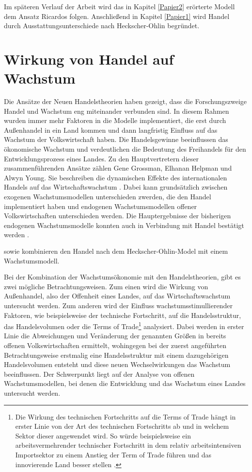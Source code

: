 Im sp{\"a}teren Verlauf der Arbeit wird das in Kapitel \ref{Papier2} er{\"o}rterte Modell dem Ansatz Ricardos folgen. Anschlie{\ss}end in Kapitel \ref{Papier1} wird Handel durch Ausstattungsunterschiede nach Heckscher-Ohlin begründet.


\section{Wirkung von Handel auf Wachstum}
Die Ansätze der Neuen Handelstheorien haben gezeigt, dass die Forschungszweige Handel und Wachstum eng miteinander verbunden sind. In diesem Rahmen wurden immer mehr Faktoren in die Modelle implementiert, die erst durch Au{\ss}enhandel in ein Land kommen und dann langfristig Einfluss auf das Wachstum der Volkswirtschaft haben. Die Handelsgewinne beeinflussen das ökonomische Wachstum und verdeutlichen die Bedeutung des Freihandels für den Entwicklungsprozess eines Landes. Zu den Hauptvertretern dieser zusammenführenden Ansätze zählen Gene Grossman, Elhanan Helpman und Alwyn Young.\newline  
Sie beschreiben die dynamischen Effekte des internationalen Handels auf das Wirtschaftswachstum \citep{Young.1991,Grossman.1995}. Dabei kann grundsätzlich zwischen exogenen Wachstumsmodellen unterschieden zwerden, die den Handel implementiert haben \citep{Dixit.1980,Ethier.1982, Krugman.1979ab,Krugman.1981,Lancaster.1980} und endogenen Wachstumsmodellen offener Volkswirtschaften \citep{Dinopoulos.,Feenstra.,Grossman.1989a,Grossman1989b.,Grossman.1990d,Grossman.1991c, Krugman.1990,Segerstrom.1990,Young.1991,Backus.} unterschieden werden. Die Hauptergebnisse der bisherigen endogenen Wachstumsmodelle konnten auch in Verbindung mit Handel bestätigt werden \citep{vanLong.1997}.

\citet{Atkeson.2000} sowie \citet{Cunat.2001} kombinieren den Handel nach dem Heckscher-Ohlin-Model mit einem Wachstumsmodell. 


Bei der Kombination der Wachstums{\"o}konomie mit den Handelstheorien, gibt es zwei m{\"o}gliche Betrachtungsweisen. Zum einen wird die Wirkung von Au{\ss}enhandel, also der Offenheit eines Landes, auf das Wirtschaftswachstum untersucht werden. Zum anderen wird der Einfluss wachstumsstimullierender Faktoren, wie beispielsweise der technische Fortschritt, auf die Handelsstruktur, das Handelsvolumen oder die Terms of Trade\footnote{Die Wirkung des technischen Fortschritts auf die Terms of Trade h{\"a}ngt in erster Linie von der Art des technischen Fortschritts ab und in welchem Sektor dieser angewendet wird. So w{\"u}rde beispielsweise ein arbeitsvermehrender technischer Fortschritt in dem relativ arbeitsintensiven Importsektor zu einem Anstieg der Term of Trade f{\"u}hren und das innovierende Land besser stellen \citep{Gandolfo.1998}.} analysiert. Dabei werden in erster Linie die Abweichungen und Ver{\"a}nderung der genannten Gr{\"o}{\ss}en in bereits offenen Volkswirtschaften ermittelt, wohingegen bei der zuerst angeführten Betrachtungsweise erstmalig eine Handelsstruktur mit einem dazugeh{\"o}rigen Handelsvolumen entsteht und diese neuen Wechselwirkungen das Wachstum beeinflussen. Der Schwerpunkt liegt auf der Analyse von offenen Wachstumsmodellen, bei denen die Entwicklung und das Wachstum eines Landes untersucht werden.


